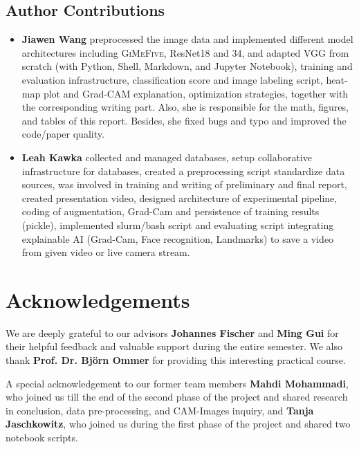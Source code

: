 \subsection*{Author Contributions}
\label{sec:author}

\begin{itemize}
  \item \textbf{Jiawen Wang} preprocessed the image data 
  and implemented different model architectures including \textsc{GiMeFive}, ResNet18 and 34, 
  and adapted VGG from scratch (with Python, Shell, Markdown, and Jupyter Notebook), 
  training and evaluation infrastructure, classification score and image labeling script, 
  heat-map plot and Grad-CAM explanation, optimization strategies, 
  together with the corresponding writing part. 
  Also, she is responsible for the math, figures, and tables of this report. 
  Besides, she fixed bugs and typo and improved the code/paper quality. 
  \item \textbf{Leah Kawka} collected and managed databases, 
  setup collaborative infrastructure for databases, created a preprocessing script standardize data sources, 
  was involved in training and writing of preliminary and final report, created presentation video, 
  designed architecture of experimental pipeline, coding of augmentation, Grad-Cam and persistence 
  of training results (pickle), implemented slurm/bash script and evaluating script integrating explainable AI 
  (Grad-Cam, Face recognition, Landmarks) to save a video from given video or live camera stream.
\end{itemize}

\section*{Acknowledgements}

We are deeply grateful to our advisors \textbf{Johannes Fischer} and \textbf{Ming Gui} for their helpful feedback and valuable support during the entire semester. 
We also thank \textbf{Prof. Dr. Björn Ommer} for providing this interesting practical course. 

A special acknowledgement to our former team members \textbf{Mahdi Mohammadi}, who joined us till the end of the 
second phase of the project and shared research in conclusion, data pre-processing, and CAM-Images inquiry, 
and \textbf{Tanja Jaschkowitz}, who joined us during the first phase of the project and shared two notebook scripts.
  
